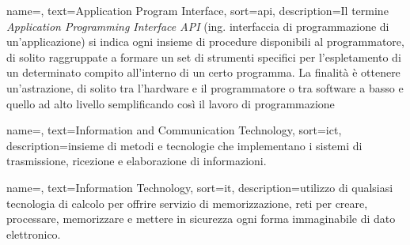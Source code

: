 
{
    name=,
    text=Application Program Interface,
    sort=api,
    description={Il termine \emph{Application Programming Interface API} (ing. interfaccia di programmazione di un'applicazione) si indica ogni insieme di procedure disponibili al programmatore, di solito raggruppate a formare un set di strumenti specifici per l'espletamento di un determinato compito all'interno di un certo programma. La finalità è ottenere un'astrazione, di solito tra l'hardware e il programmatore o tra software a basso e quello ad alto livello semplificando così il lavoro di programmazione}
}

{
	name=,
	text=Information and Communication Technology,
	sort=ict,
	description={insieme di metodi e tecnologie che implementano i sistemi di trasmissione, ricezione e elaborazione di informazioni.}
}

{
	name=,
	text=Information Technology,
	sort=it,
	description={utilizzo di qualsiasi tecnologia di calcolo per offrire servizio di memorizzazione, reti per creare, processare, memorizzare e mettere in sicurezza ogni forma immaginabile di dato elettronico.
    }
}





